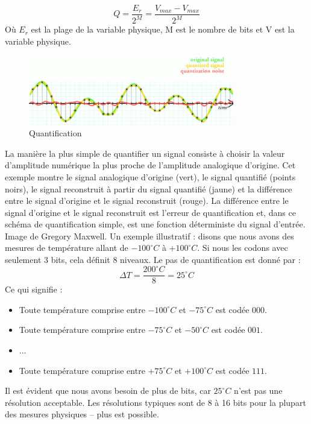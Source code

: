 \begin{equation}
            Q=\frac{E_{r}}{2^{M}}=\frac{V_{max}-V_{max}}{2^{M}}
\end{equation}
Où $ E_{r} $ est la plage de la variable physique, M est le nombre de bits et V est la variable physique.
\begin{figure}[H] %
    \centering
    \includegraphics[width=0.8\textwidth]{figures/6-16.jpg}
    \caption{Quantification}
    \label{fig:communication2}
\end{figure}
La manière la plus simple de quantifier un signal consiste à choisir la valeur d'amplitude numérique la plus proche de l'amplitude analogique d'origine. Cet exemple montre le signal analogique d'origine (vert), le signal quantifié (points noirs), le signal reconstruit à partir du signal quantifié (jaune) et la différence entre le signal d'origine et le signal reconstruit (rouge). La différence entre le signal d'origine et le signal reconstruit est l'erreur de quantification et, dans ce schéma de quantification simple, est une fonction déterministe du signal d'entrée. Image de Gregory Maxwell.
Un exemple illustratif : disons que nous avons des mesures de température allant de \(-100^\circ C\) à \(+100^\circ C\).  
Si nous les codons avec seulement 3 bits, cela définit 8 niveaux.  
Le pas de quantification est donné par :
\[
\Delta T = \frac{200^\circ C}{8} = 25^\circ C
\]
\noindent Ce qui signifie :
\begin{itemize}
    \item Toute température comprise entre \(-100^\circ C\) et \(-75^\circ C\) est codée \(000\).
    \item Toute température comprise entre \(-75^\circ C\) et \(-50^\circ C\) est codée \(001\).
    \item \(\dots\)
    \item Toute température comprise entre \(+75^\circ C\) et \(+100^\circ C\) est codée \(111\).
\end{itemize}
Il est évident que nous avons besoin de plus de bits, car \( 25^\circ C \) n'est pas une résolution acceptable.  
Les résolutions typiques sont de 8 à 16 bits pour la plupart des mesures physiques – plus est possible.
